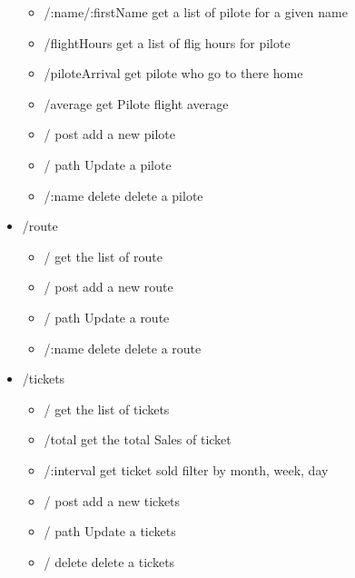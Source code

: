 \documentclass{article}
\begin{document}
\begin{itemize}
\begin{itemize}
                \item /:name/:firstName get a list of pilote for a given name
                \item /flightHours get a list of flig hours for pilote
                \item /piloteArrival get pilote who go to there home
                \item /average get Pilote flight average
                \item / post add a new pilote  
                \item / path Update a pilote
                \item /:name delete delete a pilote
            \end{itemize}
        \item /route
            \begin{itemize}
                \item / get the list of route
                \item / post add a new route  
                \item / path Update a route
                \item /:name delete delete a route
            \end{itemize}
        \item /tickets
            \begin{itemize}
                \item / get the list of tickets
                \item /total get the total Sales of ticket
                \item /:interval get ticket sold filter by month, week, day
                \item / post add a new tickets  
                \item / path Update a tickets
                \item / delete delete a tickets
            \end{itemize}
    \end{itemize}
\end{document}
